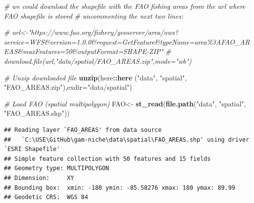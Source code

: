 \documentclass[
]{book}
\newenvironment{Shaded}{\begin{snugshade}}{\end{snugshade}}
\newcommand{\AttributeTok}[1]{\textcolor[rgb]{0.13,0.29,0.53}{#1}}
\newcommand{\CommentTok}[1]{\textcolor[rgb]{0.56,0.35,0.01}{\textit{#1}}}
\newcommand{\FunctionTok}[1]{\textcolor[rgb]{0.13,0.29,0.53}{\textbf{#1}}}
\newcommand{\NormalTok}[1]{#1}
\newcommand{\OtherTok}[1]{\textcolor[rgb]{0.56,0.35,0.01}{#1}}
\newcommand{\SpecialCharTok}[1]{\textcolor[rgb]{0.81,0.36,0.00}{\textbf{#1}}}
\newcommand{\StringTok}[1]{\textcolor[rgb]{0.31,0.60,0.02}{#1}}
\begin{document}
\begin{Shaded}
\begin{Highlighting}[]
\CommentTok{\# we could download the shapefile with the FAO fishing areas from the url where FAO shapefile is stored}
\CommentTok{\# uncommenting the next two lines: }

\CommentTok{\# url\textless{}{-}"https://www.fao.org/fishery/geoserver/area/ows?service=WFS\&version=1.0.0\&request=GetFeature\&typeName=area\%3AFAO\_AREAS\&maxFeatures=50\&outputFormat=SHAPE{-}ZIP"}
\CommentTok{\# download.file(url,"data/spatial/FAO\_AREAS.zip",mode="wb")}

\CommentTok{\# Unzip downloaded file}
\FunctionTok{unzip}\NormalTok{(here}\SpecialCharTok{::}\FunctionTok{here}\NormalTok{ (}\StringTok{"data"}\NormalTok{, }\StringTok{"spatial"}\NormalTok{, }\StringTok{"FAO\_AREAS.zip"}\NormalTok{),}\AttributeTok{exdir=}\StringTok{"data/spatial"}\NormalTok{)}

\CommentTok{\# Load FAO (spatial multipolygon)}
\NormalTok{FAO}\OtherTok{\textless{}{-}} \FunctionTok{st\_read}\NormalTok{(}\FunctionTok{file.path}\NormalTok{(}\StringTok{"data"}\NormalTok{, }\StringTok{"spatial"}\NormalTok{, }\StringTok{"FAO\_AREAS.shp"}\NormalTok{))}
\end{Highlighting}
\end{Shaded}

\begin{verbatim}
## Reading layer `FAO_AREAS' from data source 
##   `C:\USE\GitHub\gam-niche\data\spatial\FAO_AREAS.shp' using driver `ESRI Shapefile'
## Simple feature collection with 50 features and 15 fields
## Geometry type: MULTIPOLYGON
## Dimension:     XY
## Bounding box:  xmin: -180 ymin: -85.58276 xmax: 180 ymax: 89.99
## Geodetic CRS:  WGS 84
\end{verbatim}
\end{document}
